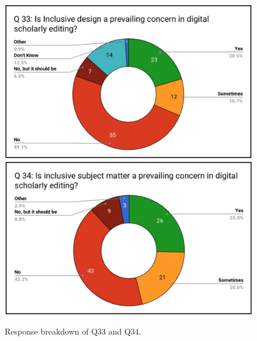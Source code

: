 \begin{paper}
\begin{figure}[p!]
\includegraphics[width=\textwidth]{media/martinez7a.png}\\
\includegraphics[width=\textwidth]{media/martinez7b.png}
\caption{Response breakdown of Q33 and Q34.}
\label{q33}
\end{figure}


\end{paper}
